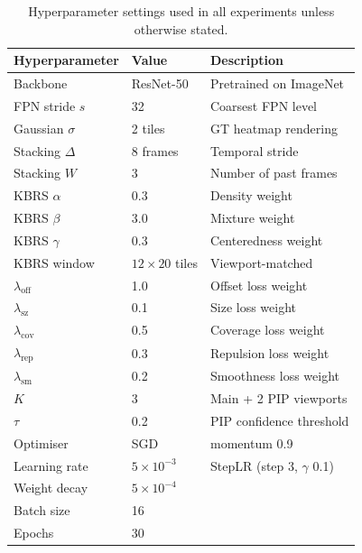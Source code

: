 \documentclass[preprint,12pt]{elsarticle}
\begin{document}
\begin{table}[h]
  \centering
  \caption{Hyperparameter settings used in all experiments unless 
  otherwise stated.}
  \label{tab:hyperparams}
  \begin{tabular}{lll}
    \toprule
    Hyperparameter & Value & Description \\
    \midrule
    Backbone         & ResNet-50  & Pretrained on ImageNet \\
    FPN stride $s$   & 32         & Coarsest FPN level \\
    Gaussian $\sigma$  & 2 tiles  & GT heatmap rendering \\
    Stacking $\Delta$  & 8 frames & Temporal stride \\
    Stacking $W$       & 3        & Number of past frames \\
    KBRS $\alpha$      & 0.3      & Density weight \\
    KBRS $\beta$       & 3.0      & Mixture weight \\
    KBRS $\gamma$      & 0.3      & Centeredness weight \\
    KBRS window        & $12{\times}20$ tiles & Viewport-matched \\
    $\lambda_{\text{off}}$   & 1.0 & Offset loss weight \\
    $\lambda_{\text{sz}}$    & 0.1 & Size loss weight \\
    $\lambda_{\text{cov}}$   & 0.5 & Coverage loss weight \\
    $\lambda_{\text{rep}}$   & 0.3 & Repulsion loss weight \\
    $\lambda_{\text{sm}}$    & 0.2 & Smoothness loss weight \\
    $K$              & 3          & Main + 2 PIP viewports \\
    $\tau$           & 0.2        & PIP confidence threshold \\
    Optimiser        & SGD        & momentum 0.9 \\
    Learning rate    & $5{\times}10^{-3}$ & StepLR (step 3, $\gamma$ 0.1) \\
    Weight decay     & $5{\times}10^{-4}$ & \\
    Batch size       & 16         & \\
    Epochs           & 30         & \\
    \bottomrule
  \end{tabular}
\end{table}




\end{document}
